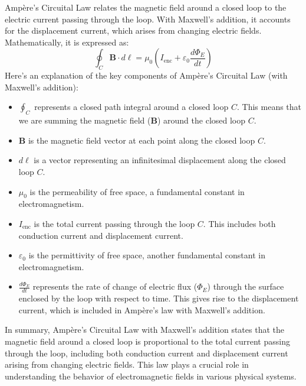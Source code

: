 Amp\`ere's Circuital Law relates the magnetic field around a closed loop to the electric current passing through the loop. With Maxwell's addition, it accounts for the displacement current, which arises from changing electric fields. Mathematically, it is expressed as:
\[
\oint_C \mathbf{B} \cdot d\boldsymbol{\ell} = \mu_0 \left( I_{\text{enc}} + \varepsilon_0 \frac{d\Phi_E}{dt} \right)
\]
Here's an explanation of the key components of Amp\`ere's Circuital Law (with Maxwell's addition):
\begin{itemize}
  \item $\oint_C$ represents a closed path integral around a closed loop $C$. This means that we are summing the magnetic field ($\mathbf{B}$) around the closed loop $C$.
  \item $\mathbf{B}$ is the magnetic field vector at each point along the closed loop $C$.
  \item $d\boldsymbol{\ell}$ is a vector representing an infinitesimal displacement along the closed loop $C$.
  \item $\mu_0$ is the permeability of free space, a fundamental constant in electromagnetism.
  \item $I_{\text{enc}}$ is the total current passing through the loop $C$. This includes both conduction current and displacement current.
  \item $\varepsilon_0$ is the permittivity of free space, another fundamental constant in electromagnetism.
  \item $\frac{d\Phi_E}{dt}$ represents the rate of change of electric flux ($\Phi_E$) through the surface enclosed by the loop with respect to time. This gives rise to the displacement current, which is included in Amp\`ere's law with Maxwell's addition.
\end{itemize}

In summary, Amp\`ere's Circuital Law with Maxwell's addition states that the magnetic field around a closed loop is proportional to the total current passing through the loop, including both conduction current and displacement current arising from changing electric fields. This law plays a crucial role in understanding the behavior of electromagnetic fields in various physical systems.



